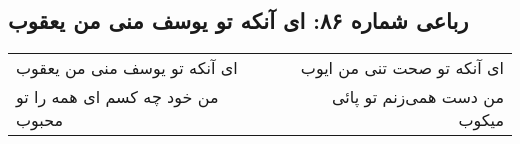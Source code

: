 \begin{center}
\section*{رباعی شماره ۸۶: ای آنکه تو یوسف منی من یعقوب}
\label{sec:0086}
\begin{longtable}{l p{0.5cm} r}
ای آنکه تو یوسف منی من یعقوب
&&
ای آنکه تو صحت تنی من ایوب
\\
من خود چه کسم ای همه را تو محبوب
&&
من دست همی‌زنم تو پائی میکوب
\\
\end{longtable}
\end{center}
